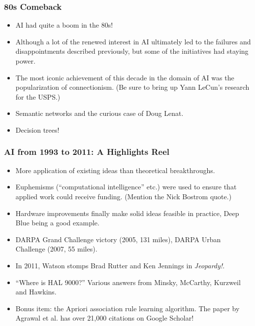 \documentclass[10pt]{beamer}
\begin{document}
  \begin{frame}
    \frametitle{80s Comeback}

    \begin{itemize}
      \item AI had quite a boom in the 80s!
      \pause
      \item Although a lot of the renewed interest in AI ultimately led to the
        failures and disappointments described previously, but some of the
        initiatives had staying power.
      \pause
      \item The most iconic achievement of this decade in the domain of AI was
        the popularization of connectionism. (Be sure to bring up Yann LeCun's
        research for the USPS.)
      \pause
      \item Semantic networks and the curious case of Doug Lenat.
      \pause
      \item Decision trees!
    \end{itemize}
  \end{frame}

  \begin{frame}
    \frametitle{AI from 1993 to 2011: A Highlights Reel}

    \begin{itemize}
      \item More application of existing ideas than theoretical breakthroughs.
      \pause
      \item Euphemisms (``computational intelligence'' etc.) were used to
        ensure that applied work could receive funding. (Mention the Nick
        Bostrom quote.)
      \pause
      \item Hardware improvements finally make solid ideas feasible in
        practice, Deep Blue being a good example.
      \pause
      \item DARPA Grand Challenge victory (2005, 131 miles), DARPA Urban
        Challenge (2007, 55 miles).
      \pause
      \item In 2011, Watson stomps Brad Rutter and Ken Jennings in
        \textit{Jeopardy!}.
      \pause
      \item ``Where is HAL 9000?'' Various answers from Minsky, McCarthy,
        Kurzweil and Hawkins.
      \pause
      \item Bonus item: the Apriori association rule learning algorithm. The
        paper by Agrawal et al. has over 21,000 citations on Google Scholar!
    \end{itemize}
  \end{frame}
\end{document}
